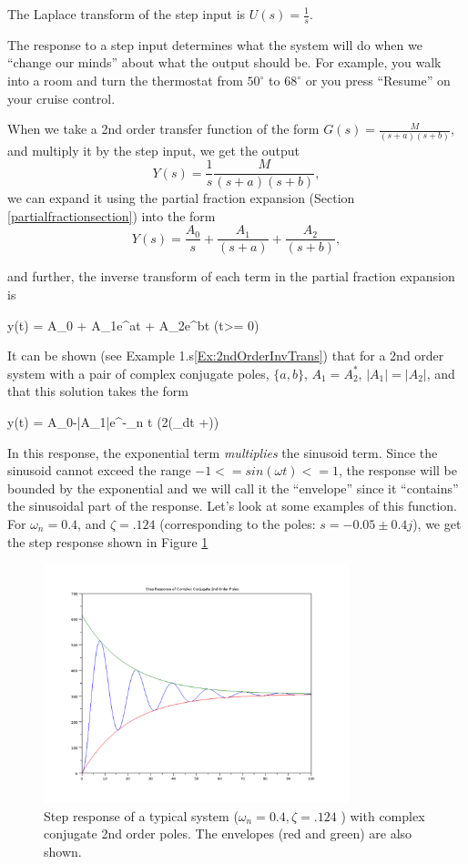 The Laplace transform of the step input is $U(s) = \frac{1}{s}$.

The response to  a step input determines what the system will do when we ``change our minds'' about what the output should be.  For example, you walk into a room and turn the thermostat from $50^\circ$ to $68^\circ$ or you press ``Resume'' on your cruise control.


When we take a 2nd order transfer function of the form $G(s) = \frac{M}{(s+a)(s+b)}$, and multiply it by the step input, we get the output
\[
Y(s) = \frac{1}{s}\frac{M}{(s+a)(s+b)},
\]
we can expand it using the partial fraction expansion (Section \ref{partialfractionsection}) into the form
\[
Y(s) = \frac{A_0}{s} + \frac{A_1}{(s+a)}+  \frac{A_2}{(s+b)},
\]

and further,  the inverse transform of each term in the partial fraction expansion is

\bq\label{dampedexponentialsolution}
y(t) = A_0 +  A_1e^{at} + A_2e^{bt}   \qquad (t>= 0)
\eq

It can be shown (see Example 1.s\ref{Ex:2ndOrderInvTrans}) that for a 2nd order system with a pair of complex conjugate poles, $\{a,b\}$, $A_1=A_2^*$, $|A_1| = |A_2|$, and that this solution takes the form

\bq\label{eqnDampedSinStep}
y(t) = A_0-|A_1|e^{-\zeta\omega_n t} (2\cos({\omega_dt +\phi}))
\eq

In this response, the exponential term {\it multiplies } the sinusoid term.  Since the sinusoid cannot exceed the range $-1<=sin(\omega t)<=1$, the response will be bounded by the exponential and we will call it the ``envelope'' since it ``contains'' the sinusoidal part of the response.
Let's look at some examples of this function.  For $\omega_n = 0.4$, and $\zeta=.124$ (corresponding to the poles: $s = -0.05\pm0.4j$), we get the step response shown in Figure \ref{typicalstep}



\begin{figure}\centering
\includegraphics[width=3.5in]{figs05/typical_stepa.png}
\caption{Step response of a typical system ($\omega_n = 0.4, \zeta=.124$ ) with complex conjugate 2nd order poles. The envelopes (red and green) are also shown.}\label{typicalstep}
\end{figure}



